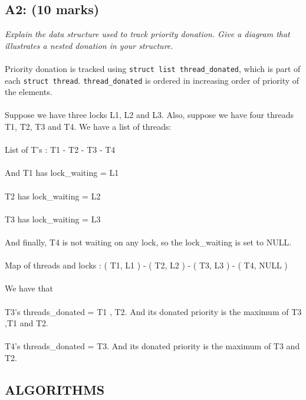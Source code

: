 \documentclass{article}
\begin{document}
\subsection*{A2: (10 marks) }

\textit{Explain the data structure used to track priority donation. Give a diagram that illustrates a nested donation in your structure.}
\\ \\
Priority donation is tracked using \texttt{struct list thread\_donated}, which is part of each
\texttt{struct thread}. \texttt{thread\_donated} is ordered in increasing order of priority of the elements.
\\ \\
Suppose we have three locks L1, L2 and L3. Also, suppose we have four threads T1, T2, T3 and T4.
We have a list of threads:
\\ \\
List of T's : T1 - T2 - T3 - T4
\\ \\
And T1 has lock\_waiting =  L1
\\ \\
T2 has lock\_waiting  = L2
\\ \\
T3 has lock\_waiting =  L3
\\ \\
And finally, T4 is not waiting on any lock, so the lock\_waiting is set to NULL.
\\ \\
Map of threads and locks :
( T1, L1 )  - ( T2, L2 ) - ( T3, L3 ) - ( T4, NULL )
\\ \\
We have that
\\ \\
T3's threads\_donated = T1 , T2.
And its donated priority is the maximum of T3 ,T1 and T2.
\\ \\
T4's threads\_donated = T3.
And its donated priority is the maximum of T3 and T2.


\subsection{ALGORITHMS}
\end{document}
